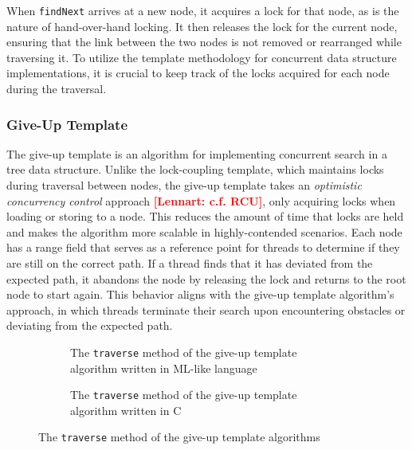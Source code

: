 \documentclass[a4paper,UKenglish,cleveref, autoref, thm-restate]{lipics-v2021}
\newcommand{\lb}[1]{\textbf{\textcolor{red}{[Lennart: #1]}}}
\begin{document}
When \lstinline{findNext} arrives at a new node, it acquires a lock for that node, as is the nature of hand-over-hand locking. It then releases the lock for the current node, ensuring that the link between the two nodes is not removed or rearranged while traversing it. To utilize the template methodology for concurrent data structure implementations, it is crucial to keep track of the locks acquired for each node during the traversal. 

\subsubsection{Give-Up Template}
The give-up template is an algorithm for implementing concurrent search in a tree data structure. Unlike the lock-coupling template, which maintains locks during traversal between nodes, the give-up template takes an \emph{optimistic concurrency control} approach \lb{c.f. RCU}, only acquiring locks when loading or storing to a node. This reduces the amount of time that locks are held and makes the algorithm more scalable in highly-contended scenarios. Each node has a range field that serves as a reference point for threads to determine if they are still on the correct path. If a thread finds that it has deviated from the expected path, it abandons the node by releasing the lock and returns to the root node to start again. This behavior aligns with the give-up template algorithm's approach, in which threads terminate their search upon encountering obstacles or deviating from the expected path.

\begin{figure}[!ht]
	\begin{subfigure}[t]{0.45\textwidth}
		 
		\caption{The \lstinline{traverse} method of the give-up template algorithm written in ML-like language}
		\label{traverse_giveup_a}	
	\end{subfigure}\qquad
	\begin{subfigure}[t]{0.48\textwidth}
		 
		\caption{The \lstinline{traverse} method of the give-up template algorithm written in C}
		\label{traverse_giveup_b}
	\end{subfigure}
	\caption{The \lstinline{traverse} method of the give-up template algorithms}
	\label{traverse_giveup}
\end{figure}
\end{document}
